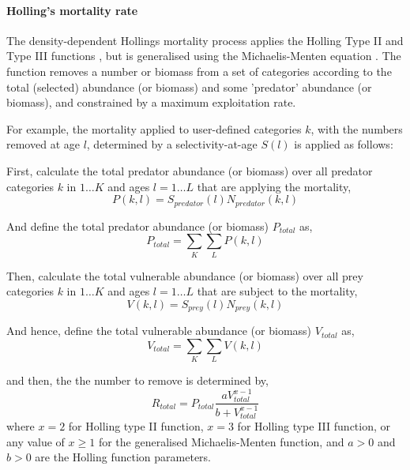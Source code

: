 \paragraph{Holling's mortality rate}

The density-dependent Hollings mortality process applies the Holling Type II and Type III functions \citep{Holling1959}, but is generalised using the Michaelis-Menten equation \citep{MentenMichaelis1913}. The function removes a number or biomass from a set of categories according to the total (selected) abundance (or biomass) and some 'predator' abundance (or biomass), and constrained by a maximum exploitation rate.

For example, the mortality applied to user-defined categories $k$, with the numbers removed at age $l$, determined by a selectivity-at-age $S(l)$ is applied as follows:

First, calculate the total predator abundance (or biomass) over all predator categories $k$ in $1 \ldots K$ and ages $l = 1 \ldots L$ that are applying the mortality,
\begin{equation}
	P(k,l) = S_{predator}(l) N_{predator}(k,l)
\end{equation}

And define the total predator abundance (or biomass) $P_{total}$ as,
\begin{equation}
	P_{total}  = \sum\limits_K {\sum\limits_L {P(k,l)}}
\end{equation}

Then, calculate the total vulnerable abundance (or biomass) over all prey categories $k$ in $1 \ldots K$ and ages $l = 1 \ldots L$ that are subject to the mortality,
\begin{equation}
	V(k,l) = S_{prey}(l) N_{prey}(k,l)
\end{equation}

And hence, define the total vulnerable abundance (or biomass) $V_{total}$ as,
\begin{equation}
	V_{total}  = \sum\limits_K {\sum\limits_L {V(k,l)}}
\end{equation}

and then, the the number to remove is determined by,
\begin{equation}
	R_{total} = P_{total} \frac{a  V_{total}^{x-1}}{b + V_{total}^{x-1}}
\end{equation}
where $x=2$ for Holling type II function,  $x=3$ for Holling type III function, or any value of $x \geq 1$ for the generalised Michaelis-Menten function, and $a > 0$ and $b > 0$ are the Holling function parameters.

